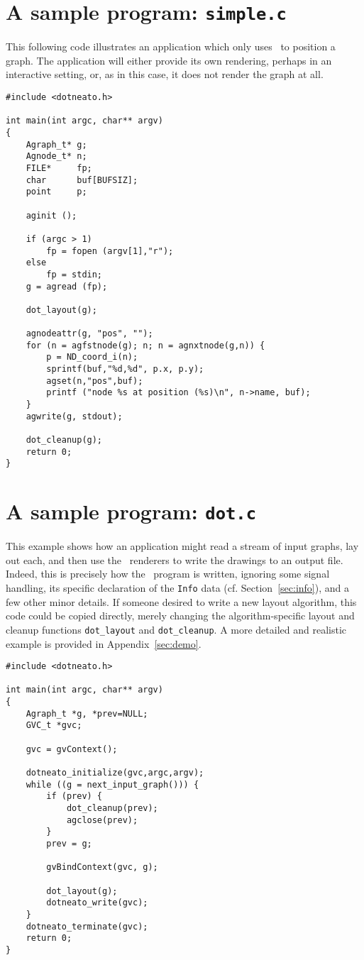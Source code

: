 \section{A sample program: {\tt simple.c}}
\label{sec:simple}
This following code illustrates an application which only uses \gviz\ to
position a graph. The application will either provide its own
rendering, perhaps in an interactive setting, or, as in this
case, it does not render the graph at all.
\pagebreak[4]
\begin{verbatim}
#include <dotneato.h>

int main(int argc, char** argv)
{
    Agraph_t* g;
    Agnode_t* n;
    FILE*     fp;
    char      buf[BUFSIZ];
    point     p;

    aginit ();

    if (argc > 1)
        fp = fopen (argv[1],"r");
    else
        fp = stdin;
    g = agread (fp);

    dot_layout(g);
    
    agnodeattr(g, "pos", "");
    for (n = agfstnode(g); n; n = agnxtnode(g,n)) {
        p = ND_coord_i(n);
        sprintf(buf,"%d,%d", p.x, p.y);
        agset(n,"pos",buf);
        printf ("node %s at position (%s)\n", n->name, buf);
    }
    agwrite(g, stdout);

    dot_cleanup(g);
    return 0;
}	
\end{verbatim}

\section{A sample program: {\tt dot.c}}
\label{sec:dot}
This example shows how an application might read a stream of input graphs,
lay out each, and then use the \gviz\ renderers to write the drawings
to an output file. Indeed, this
is precisely how the \dot\ program is written, ignoring some signal
handling, its specific declaration of 
the {\tt Info} data (cf. Section~\ref{sec:info}), and a few other
minor details.
If someone desired to write a new layout algorithm, this
code could be copied directly, merely changing the algorithm-specific 
layout and cleanup functions \verb+dot_layout+ and \verb+dot_cleanup+.
A more detailed and realistic example is provided in Appendix~\ref{sec:demo}.

\begin{verbatim}
#include <dotneato.h>

int main(int argc, char** argv)
{
    Agraph_t *g, *prev=NULL;
    GVC_t *gvc;

    gvc = gvContext();

    dotneato_initialize(gvc,argc,argv);
    while ((g = next_input_graph())) {
        if (prev) {
            dot_cleanup(prev);
            agclose(prev);
        }
        prev = g;

        gvBindContext(gvc, g);

        dot_layout(g);
        dotneato_write(gvc);
    }
    dotneato_terminate(gvc);
    return 0;
}
\end{verbatim}

